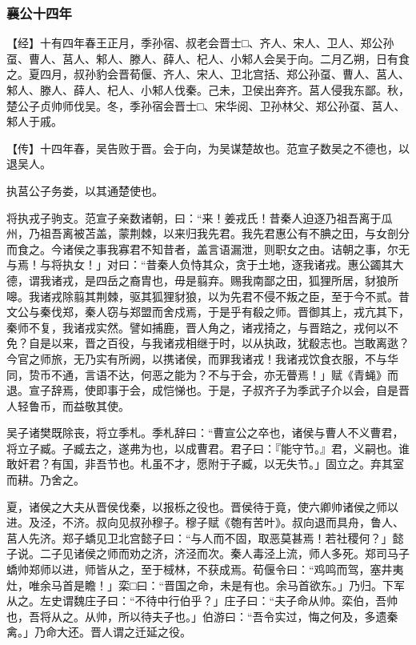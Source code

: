 \documentclass[]{article}
\begin{document}
\hypertarget{header-n1988}{%
\subsubsection{襄公十四年}\label{header-n1988}}

【经】十有四年春王正月，季孙宿、叔老会晋士□、齐人、宋人、卫人、郑公孙虿、曹人、莒人、邾人、滕人、薛人、杞人、小邾人会吴于向。二月乙朔，日有食之。夏四月，叔孙豹会晋荀偃、齐人、宋人、卫北宫括、郑公孙虿、曹人、莒人、邾人、滕人、薛人、杞人、小邾人伐秦。己未，卫侯出奔齐。莒人侵我东鄙。秋，楚公子贞帅师伐吴。冬，季孙宿会晋士□、宋华阅、卫孙林父、郑公孙虿、莒人、邾人于戚。

【传】十四年春，吴告败于晋。会于向，为吴谋楚故也。范宣子数吴之不德也，以退吴人。

执莒公子务娄，以其通楚使也。

将执戎子驹支。范宣子亲数诸朝，曰：``来！姜戎氏！昔秦人迫逐乃祖吾离于瓜州，乃祖吾离被苫盖，蒙荆棘，以来归我先君。我先君惠公有不腆之田，与女剖分而食之。今诸侯之事我寡君不知昔者，盖言语漏泄，则职女之由。诘朝之事，尔无与焉！与将执女！」对曰：``昔秦人负恃其众，贪于土地，逐我诸戎。惠公蠲其大德，谓我诸戎，是四岳之裔胄也，毋是翦弃。赐我南鄙之田，狐狸所居，豺狼所嗥。我诸戎除翦其荆棘，驱其狐狸豺狼，以为先君不侵不叛之臣，至于今不贰。昔文公与秦伐郑，秦人窃与郑盟而舍戍焉，于是乎有殽之师。晋御其上，戎亢其下，秦师不复，我诸戎实然。譬如捕鹿，晋人角之，诸戎掎之，与晋踣之，戎何以不免？自是以来，晋之百役，与我诸戎相继于时，以从执政，犹殽志也。岂敢离逖？今官之师旅，无乃实有所阙，以携诸侯，而罪我诸戎！我诸戎饮食衣服，不与华同，贽币不通，言语不达，何恶之能为？不与于会，亦无瞢焉！」赋《青蝇》而退。宣子辞焉，使即事于会，成恺悌也。于是，子叔齐子为季武子介以会，自是晋人轻鲁币，而益敬其使。

吴子诸樊既除丧，将立季札。季札辞曰：``曹宣公之卒也，诸侯与曹人不义曹君，将立子臧。子臧去之，遂弗为也，以成曹君。君子曰：『能守节。』君，义嗣也。谁敢奸君？有国，非吾节也。札虽不才，愿附于子臧，以无失节。」固立之。弃其室而耕。乃舍之。

夏，诸侯之大夫从晋侯伐秦，以报栎之役也。晋侯待于竟，使六卿帅诸侯之师以进。及泾，不济。叔向见叔孙穆子。穆子赋《匏有苦叶》。叔向退而具舟，鲁人、莒人先济。郑子蟜见卫北宫懿子曰：``与人而不固，取恶莫甚焉！若社稷何？」懿子说。二子见诸侯之师而劝之济，济泾而次。秦人毒泾上流，师人多死。郑司马子蟜帅郑师以进，师皆从之，至于棫林，不获成焉。荀偃令曰：``鸡鸣而驾，塞井夷灶，唯余马首是瞻！」栾□曰：``晋国之命，未是有也。余马首欲东。」乃归。下军从之。左史谓魏庄子曰：``不待中行伯乎？」庄子曰：``夫子命从帅。栾伯，吾帅也，吾将从之。从帅，所以待夫子也。」伯游曰：``吾令实过，悔之何及，多遗秦禽。」乃命大还。晋人谓之迁延之役。
\end{document}
